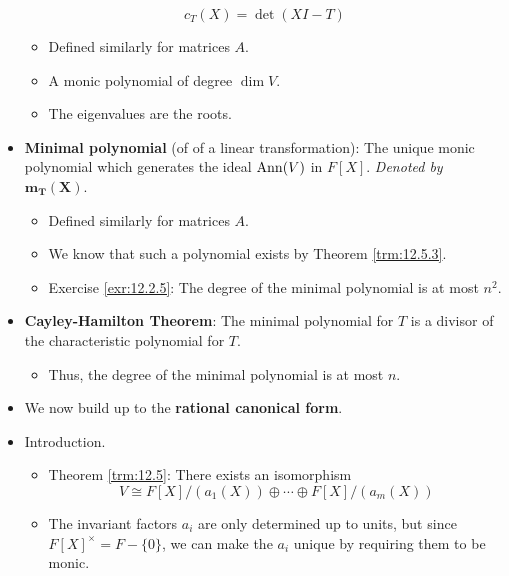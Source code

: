 \documentclass[../notes.tex]{subfiles}
\begin{document}
\begin{itemize}
\begin{equation*}
        c_T(X) = \det(XI-T)
    \end{equation*}
    \begin{itemize}
        \item Defined similarly for matrices $A$.
        \item A monic polynomial of degree $\dim V$.
        \item The eigenvalues are the roots.
    \end{itemize}
    \item \textbf{Minimal polynomial} (of of a linear transformation): The unique monic polynomial which generates the ideal $\operatorname{Ann}(V)$ in $F[X]$. \emph{Denoted by} $\bm{m_T(X)}$.
    \begin{itemize}
        \item Defined similarly for matrices $A$.
        \item We know that such a polynomial exists by Theorem \ref{trm:12.5.3}.
        \item Exercise \ref{exr:12.2.5}: The degree of the minimal polynomial is at most $n^2$.
    \end{itemize}
    \item \textbf{Cayley-Hamilton Theorem}: The minimal polynomial for $T$ is a divisor of the characteristic polynomial for $T$.
    \begin{itemize}
        \item Thus, the degree of the minimal polynomial is at most $n$.
    \end{itemize}
    \item We now build up to the \textbf{rational canonical form}.
    \item Introduction.
    \begin{itemize}
        \item Theorem \ref{trm:12.5}: There exists an isomorphism
        \begin{equation}\label{eqn:12.1}
            V \cong F[X]/(a_1(X))\oplus\cdots\oplus F[X]/(a_m(X))
        \end{equation}
        \item The invariant factors $a_i$ are only determined up to units, but since $F[X]^\times=F-\{0\}$, we can make the $a_i$ unique by requiring them to be monic.

\end{itemize}
\end{itemize}
\end{document}
